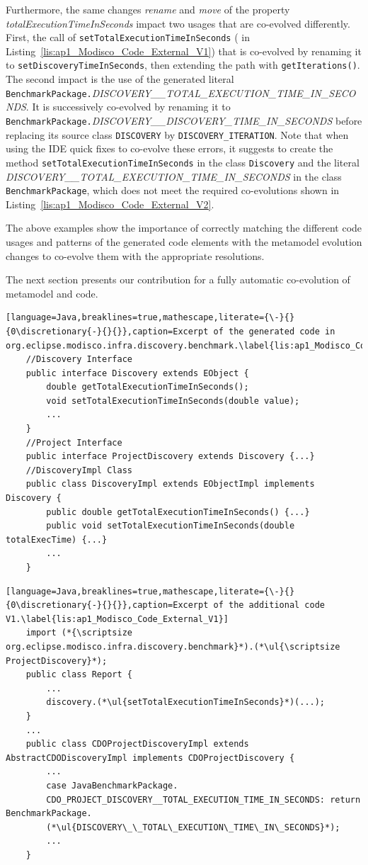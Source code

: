 Furthermore, the same changes \textit{rename} and \textit{move} of the property \emph{totalExecutionTimeInSeconds} impact two usages that are co-evolved differently. First, the call of \texttt{setTotalExecutionTimeInSeconds} ({\small{}} in Listing~\ref{lis:ap1_Modisco_Code_External_V1}) that is co-evolved by renaming it to \texttt{setDiscoveryTimeInSeconds}, then extending the path with \texttt{getIterations()}. The second impact is the use of the generated literal \texttt{BenchmarkPackage.}\emph{\footnotesize{DISCOVERY\_\_TOTAL\_EXECUTION\_TIME\_IN\_SECONDS}}. It is successively co-evolved by renaming it to \texttt{BenchmarkPackage.}\emph{\footnotesize{DISCOVERY\_\_DISCOVERY\_TIME\_IN\_SECONDS}} before replacing its source class \texttt{DISCOVERY} by \texttt{DISCOVERY\_ITERATION}. 
Note that when using the IDE quick fixes to co-evolve these errors, it suggests to create the method \texttt{setTotalExecutionTimeInSeconds} in the class \texttt{Discovery} and the literal \emph{\footnotesize{DISCOVERY\_\_TOTAL\_EXECUTION\_TIME\_IN\_SECONDS}} in the class \texttt{BenchmarkPackage}, which does not meet the required co-evolutions shown in Listing~\ref{lis:ap1_Modisco_Code_External_V2}.

The above examples show the importance of correctly matching the different code usages and patterns of the generated code elements with the metamodel evolution changes to co-evolve them with the appropriate resolutions. 

The next section presents our contribution for a fully automatic co-evolution of metamodel and code.  

\begin{lstlisting}[language=Java,breaklines=true,mathescape,literate={\-}{}{0\discretionary{-}{}{}},caption=Excerpt of the generated code in org.eclipse.modisco.infra.discovery.benchmark.\label{lis:ap1_Modisco_Code_API_V1}]
	//Discovery Interface
	public interface Discovery extends EObject {
		double getTotalExecutionTimeInSeconds();
		void setTotalExecutionTimeInSeconds(double value);
		...
	}
	//Project Interface
	public interface ProjectDiscovery extends Discovery {...}
	//DiscoveryImpl Class
	public class DiscoveryImpl extends EObjectImpl implements Discovery {
		public double getTotalExecutionTimeInSeconds() {...}
		public void setTotalExecutionTimeInSeconds(double totalExecTime) {...}
		...
	}
\end{lstlisting}
\begin{lstlisting}[language=Java,breaklines=true,mathescape,literate={\-}{}{0\discretionary{-}{}{}},caption=Excerpt of the additional code V1.\label{lis:ap1_Modisco_Code_External_V1}]
	import (*{\scriptsize org.eclipse.modisco.infra.discovery.benchmark}*).(*\ul{\scriptsize ProjectDiscovery}*);
	public class Report {
		...
		discovery.(*\ul{setTotalExecutionTimeInSeconds}*)(...);
	}
	...
	public class CDOProjectDiscoveryImpl extends AbstractCDODiscoveryImpl implements CDOProjectDiscovery {
		...
		case JavaBenchmarkPackage.
		CDO_PROJECT_DISCOVERY__TOTAL_EXECUTION_TIME_IN_SECONDS: return BenchmarkPackage.
		(*\ul{DISCOVERY\_\_TOTAL\_EXECUTION\_TIME\_IN\_SECONDS}*);
		...
	}
	
	
\end{lstlisting}

